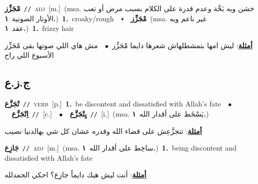\documentclass[10pt,a4paper,twoside]{article} %
\begin{document}
\begin{multicols}{2}
{\setlength\topsep{0pt}\textbf{\foreignlanguage{arabic}{مْجَزِّز}}\ {\color{gray}\texttt{//}\color{black}}\ \textsc{adj}\ [m.]\ \color{gray}(msa. \foreignlanguage{arabic}{خشن وبه بَحَّة وعدم قدرة على الكلام بسبب مرض أو تعب الأوتار الصوتية}~\foreignlanguage{arabic}{\textbf{١.}})\color{black}\ \textbf{1.}~croaky/rough\ \ $\smblkdiamond$\ \ \setlength\topsep{0pt}\textbf{\foreignlanguage{arabic}{مْجَزِّز}}\ \color{gray}(msa. \foreignlanguage{arabic}{غير ناعم وبه عقد}~\foreignlanguage{arabic}{\textbf{١.}})\color{black}\ \textbf{1.}~frizzy hair\  \begin{flushright}\color{gray}\foreignlanguage{arabic}{\textbf{\underline{\foreignlanguage{arabic}{أمثلة}}}: ليش امها بتمشطلهاش شعرها دايما مْجَزِّز\ $\bullet$\ \  مش هاي اللي صوتها بقى مْجَزِّز الأسبوع اللي راح}\end{flushright}\color{black}} \vspace{2mm}

\vspace{-3mm}
\subsection*{\color{blue}\foreignlanguage{arabic}{ج.ز.ع}\color{blue}{}} 

{\setlength\topsep{0pt}\textbf{\foreignlanguage{arabic}{تْجَزَّع}}\ {\color{gray}\texttt{//}\color{black}}\ \textsc{verb}\ [p.]\ \textbf{1.}~be discontent and dissatisfied with Allah's fate\ \ $\bullet$\ \ \setlength\topsep{0pt}\textbf{\foreignlanguage{arabic}{اِتْجَزَّع}}\ {\color{gray}\texttt{//}\color{black}}\ [c.]\ \ $\bullet$\ \ \setlength\topsep{0pt}\textbf{\foreignlanguage{arabic}{يِتْجَزَّع}}\ {\color{gray}\texttt{//}\color{black}}\ [i.]\ \color{gray}(msa. \foreignlanguage{arabic}{يَسْخَط على أقدار الله}~\foreignlanguage{arabic}{\textbf{١.}})\color{black}\  \begin{flushright}\color{gray}\foreignlanguage{arabic}{\textbf{\underline{\foreignlanguage{arabic}{أمثلة}}}: تتجزَّعِش على قضاء الله وقدره عشان كل شي بهالدنيا نصيب}\end{flushright}\color{black}} \vspace{2mm}

{\setlength\topsep{0pt}\textbf{\foreignlanguage{arabic}{جَازِع}}\ {\color{gray}\texttt{//}\color{black}}\ \textsc{adj}\ [m.]\ \color{gray}(msa. \foreignlanguage{arabic}{ساخِط على أقدار الله}~\foreignlanguage{arabic}{\textbf{١.}})\color{black}\ \textbf{1.}~being discontent and dissatisfied with Allah's fate\  \begin{flushright}\color{gray}\foreignlanguage{arabic}{\textbf{\underline{\foreignlanguage{arabic}{أمثلة}}}: أنت ليش هيك دايماً جازِع؟ احكي الحمدلله}\end{flushright}\color{black}} \vspace{2mm}


\end{multicols}
\end{document}
